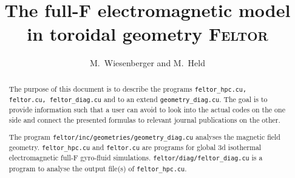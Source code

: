 





\title{
The full-F electromagnetic model in toroidal geometry \textsc{Feltor}}
\author{ M.~Wiesenberger and M.~Held}
\maketitle

\begin{abstract}
The purpose of this document is to describe the programs
\texttt{feltor\_hpc.cu, feltor.cu, feltor\_diag.cu} and to an extend
\texttt{geometry\_diag.cu}. The goal is to provide
information such that a user can avoid to look
into the actual codes on the one side and connect
the presented formulas to relevant journal publications on the other.

The program \texttt{feltor/inc/geometries/geometry\_diag.cu}
analyses the magnetic field geometry.
\texttt{feltor\_hpc.cu} and \texttt{feltor.cu} are programs for global 3d isothermal electromagnetic full-F gyro-fluid simulations.
\texttt{feltor/diag/feltor\_diag.cu} is a program to analyse the output
file(s) of \texttt{feltor\_hpc.cu}.

\end{abstract}
\tableofcontents

